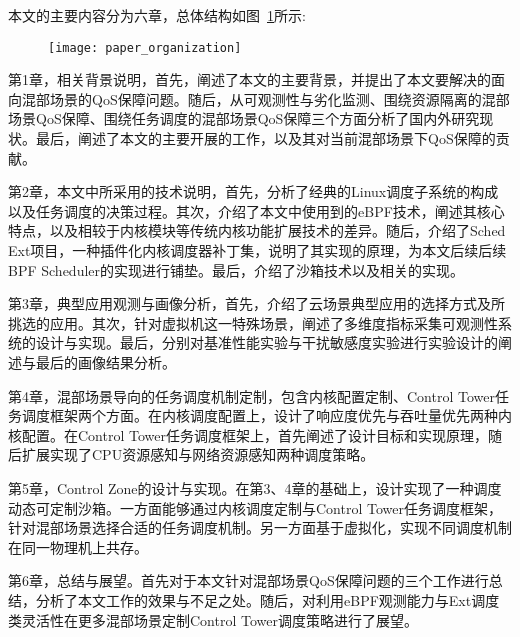 本文的主要内容分为六章，总体结构如图~\ref{fig:paper_organization}所示:

\begin{figure}[!htbp]
    \centering
    \texttt{[image: paper\_organization]}
    \label{fig:paper_organization}
\end{figure}

第1章，相关背景说明，首先，阐述了本文的主要背景，并提出了本文要解决的面向混部场景的QoS保障问题。随后，从可观测性与劣化监测、围绕资源隔离的混部场景QoS保障、围绕任务调度的混部场景QoS保障三个方面分析了国内外研究现状。最后，阐述了本文的主要开展的工作，以及其对当前混部场景下QoS保障的贡献。

第2章，本文中所采用的技术说明，首先，分析了经典的Linux调度子系统的构成以及任务调度的决策过程。其次，介绍了本文中使用到的eBPF技术，阐述其核心特点，以及相较于内核模块等传统内核功能扩展技术的差异。随后，介绍了Sched Ext项目，一种插件化内核调度器补丁集，说明了其实现的原理，为本文后续后续BPF Scheduler的实现进行铺垫。最后，介绍了沙箱技术以及相关的实现。

第3章，典型应用观测与画像分析，首先，介绍了云场景典型应用的选择方式及所挑选的应用。其次，针对虚拟机这一特殊场景，阐述了多维度指标采集可观测性系统的设计与实现。最后，分别对基准性能实验与干扰敏感度实验进行实验设计的阐述与最后的画像结果分析。

第4章，混部场景导向的任务调度机制定制，包含内核配置定制、Control Tower任务调度框架两个方面。在内核调度配置上，设计了响应度优先与吞吐量优先两种内核配置。在Control Tower任务调度框架上，首先阐述了设计目标和实现原理，随后扩展实现了CPU资源感知与网络资源感知两种调度策略。

第5章，Control Zone的设计与实现。在第3、4章的基础上，设计实现了一种调度动态可定制沙箱。一方面能够通过内核调度定制与Control Tower任务调度框架，针对混部场景选择合适的任务调度机制。另一方面基于虚拟化，实现不同调度机制在同一物理机上共存。

第6章，总结与展望。首先对于本文针对混部场景QoS保障问题的三个工作进行总结，分析了本文工作的效果与不足之处。随后，对利用eBPF观测能力与Ext调度类灵活性在更多混部场景定制Control Tower调度策略进行了展望。